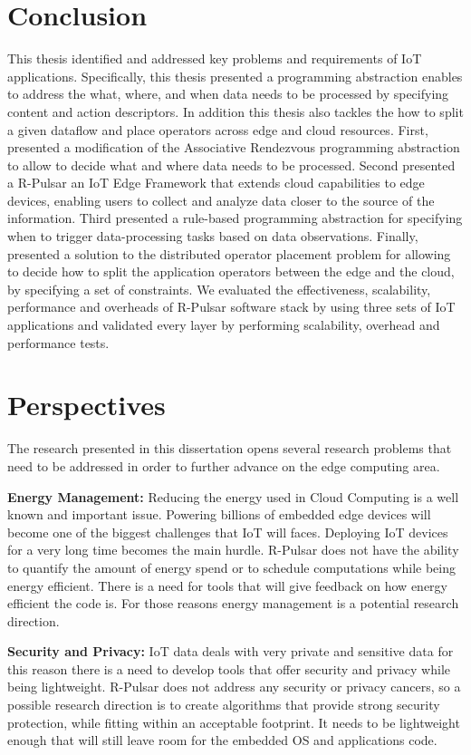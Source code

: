 \section{Conclusion}
This thesis identified and addressed key problems and requirements of IoT applications. Specifically, this thesis presented a programming abstraction enables to address the what, where, and when data needs to be processed by specifying content and action descriptors. In addition this thesis also tackles the how to split a given dataflow and place operators across edge and cloud resources. First, presented a modification of the Associative Rendezvous programming abstraction to allow to decide what and where data needs to be processed. Second presented a R-Pulsar an IoT Edge Framework that extends cloud capabilities to edge devices, enabling users to collect and analyze data closer to the source of the information. Third presented a rule-based programming abstraction for specifying when to trigger data-processing tasks based on data observations. Finally, presented a solution to the distributed operator placement problem for allowing to decide how to split the application operators between the edge and the cloud, by specifying a set of constraints. We evaluated the effectiveness, scalability, performance and overheads of R-Pulsar software stack by using three sets of IoT applications and validated every layer by performing scalability, overhead and performance tests.

\section{Perspectives}
The research presented in this dissertation opens several research problems that need to be addressed in order to further advance on the edge computing area.

\textbf{Energy Management:} Reducing the energy used in Cloud Computing is a well known and important issue. Powering billions of embedded edge devices will become one of the biggest challenges that IoT will faces. Deploying IoT devices for a very long time becomes the main hurdle. R-Pulsar does not have the ability to quantify the amount of energy spend or to schedule computations while being energy efficient. There is a need for tools that will give feedback on how energy efficient the code is. For those reasons energy management is a potential research direction. 

\textbf{Security and Privacy:} IoT data deals with very private and sensitive data for this reason there is a need to develop tools that offer security and privacy while being lightweight. R-Pulsar does not address any security or privacy cancers, so a possible research direction is to create algorithms that provide strong security protection, while fitting within an acceptable footprint. It needs to be lightweight enough that will still leave room for the embedded OS and applications code. 

